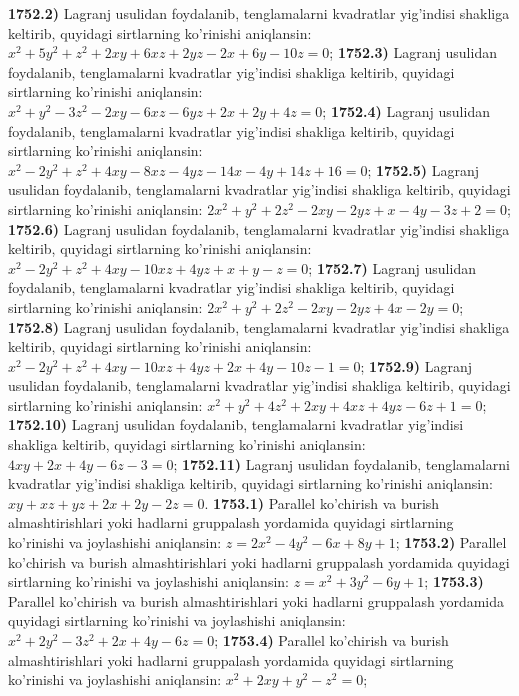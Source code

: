 \textbf{1752.2)} Lagranj usulidan foydalanib, tenglamalarni kvadratlar yig'indisi shakliga keltirib, quyidagi sirtlarning ko'rinishi aniqlansin: $x^2+5 y^2+z^2+2 x y+6 x z+2 y z-2 x+6 y-10 z=0$;
\textbf{1752.3)} Lagranj usulidan foydalanib, tenglamalarni kvadratlar yig'indisi shakliga keltirib, quyidagi sirtlarning ko'rinishi aniqlansin: $x^2+y^2-3 z^2-2 x y-6 x z-6 y z+2 x+2 y+4 z=0$;
\textbf{1752.4)} Lagranj usulidan foydalanib, tenglamalarni kvadratlar yig'indisi shakliga keltirib, quyidagi sirtlarning ko'rinishi aniqlansin: $x^2-2 y^2+z^2+4 x y-8 x z-4 y z-14 x-4 y+14 z+16=0$;
\textbf{1752.5)} Lagranj usulidan foydalanib, tenglamalarni kvadratlar yig'indisi shakliga keltirib, quyidagi sirtlarning ko'rinishi aniqlansin: $2 x^2+y^2+2 z^2-2 x y-2 y z+x-4 y-3 z+2=0$;
\textbf{1752.6)} Lagranj usulidan foydalanib, tenglamalarni kvadratlar yig'indisi shakliga keltirib, quyidagi sirtlarning ko'rinishi aniqlansin: $x^2-2 y^2+z^2+4 x y-10 x z+4 y z+x+y-z=0$;
\textbf{1752.7)} Lagranj usulidan foydalanib, tenglamalarni kvadratlar yig'indisi shakliga keltirib, quyidagi sirtlarning ko'rinishi aniqlansin: $2 x^2+y^2+2 z^2-2 x y-2 y z+4 x-2 y=0$;
\textbf{1752.8)} Lagranj usulidan foydalanib, tenglamalarni kvadratlar yig'indisi shakliga keltirib, quyidagi sirtlarning ko'rinishi aniqlansin: $x^2-2 y^2+z^2+4 x y-10 x z+4 y z+2 x+4 y-10 z-1=0$;
\textbf{1752.9)} Lagranj usulidan foydalanib, tenglamalarni kvadratlar yig'indisi shakliga keltirib, quyidagi sirtlarning ko'rinishi aniqlansin: $x^2+y^2+4 z^2+2 x y+4 x z+4 y z-6 z+1=0$;
\textbf{1752.10)} Lagranj usulidan foydalanib, tenglamalarni kvadratlar yig'indisi shakliga keltirib, quyidagi sirtlarning ko'rinishi aniqlansin: $4 x y+2 x+4 y-6 z-3=0$;
\textbf{1752.11)} Lagranj usulidan foydalanib, tenglamalarni kvadratlar yig'indisi shakliga keltirib, quyidagi sirtlarning ko'rinishi aniqlansin: $x y+x z+y z+2 x+2 y-2 z=0$.
\textbf{1753.1)} Parallel ko'chirish va burish almashtirishlari yoki hadlarni gruppalash yordamida quyidagi sirtlarning ko'rinishi va joylashishi aniqlansin: $z=2 x^2-4 y^2-6 x+8 y+1$;
\textbf{1753.2)} Parallel ko'chirish va burish almashtirishlari yoki hadlarni gruppalash yordamida quyidagi sirtlarning ko'rinishi va joylashishi aniqlansin: $z=x^2+3 y^2-6 y+1$;
\textbf{1753.3)} Parallel ko'chirish va burish almashtirishlari yoki hadlarni gruppalash yordamida quyidagi sirtlarning ko'rinishi va joylashishi aniqlansin: $x^2+2 y^2-3 z^2+2 x+4 y-6 z=0$;
\textbf{1753.4)} Parallel ko'chirish va burish almashtirishlari yoki hadlarni gruppalash yordamida quyidagi sirtlarning ko'rinishi va joylashishi aniqlansin: $x^2+2 x y+y^2-z^2=0$;
